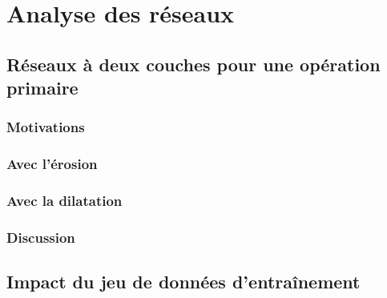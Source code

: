 \documentclass[12pt, twoside, letterpaper, french]{article}
\begin{document}

\section{Analyse des réseaux}

\subsection{Réseaux à deux couches pour une opération primaire}

\subsubsection{Motivations}
\vspace{0.2cm}

\newpage

\subsubsection{Avec l'érosion}
\vspace{0.2cm}


\subsubsection{Avec la dilatation}
\vspace{0.46cm}


\subsubsection{Discussion}
\vspace{0.32cm}

\newpage

\subsection{Impact du jeu de données d'entraînement}
\end{document}
